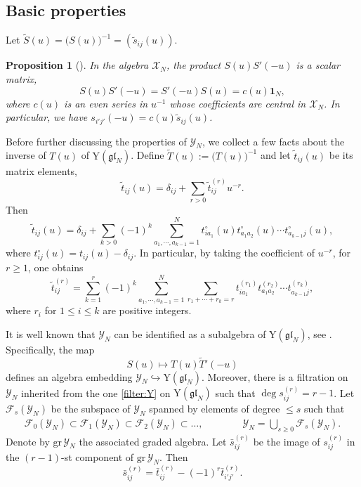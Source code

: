 \documentclass[11pt,reqno]{amsart}
\numberwithin{equation}{section}
\newtheorem{prop}[thm]{Proposition}
\theoremstyle{definition}
\theoremstyle{remark}
\newcommand{\beq}{\begin{equation}}
\newcommand{\eeq}{\end{equation}}
\newcommand{\gl}{\mathfrak{gl}}
\newcommand{\rY}{\mathrm{Y}}
\newcommand{\gr}{{\mathrm{gr}}}
\newcommand{\tl}{\tilde}
\newcommand{\wtl}{\widetilde}
\newcommand{\gge}{\geqslant}
\newcommand{\lle}{\leqslant}
\newcommand{\Y}{{\mathscr{Y}}}
\newcommand{\scrX}{{\mathscr{X}}}
\begin{document}
\subsection{Basic properties}\label{sec:basics}
Let $\wtl S(u)=\big(S(u)\big)^{-1}=(\tl s_{ij}(u))$.
\begin{prop}[{\cite[Prop. 2.1]{MR02}}]\label{Binv}
In the algebra $\scrX_N$, the product $S(u)S'(-u)$ is a scalar matrix,
\beq\label{cudef}
S(u)S'(-u)=S'(-u)S(u)=c(u)\mathbf{1}_N,
\eeq
where $c(u)$ is an even series in $u^{-1}$ whose coefficients are central in $\scrX_N$. In particular, we have $s_{i'j'}(-u)=c(u)\tl s_{ij}(u)$.
\end{prop}

Before further discussing the properties of $\Y_N$, we collect a few facts about the inverse of $T(u)$ of $\rY(\gl_N)$. Define $\wtl T(u):=\big(T(u)\big)^{-1}$ and let $\tl t_{ij}(u)$ be its matrix elements, 
$$
\tl t_{ij}(u)=\delta_{ij}+\sum_{r>0} \tl {t}_{ij}^{(r)}u^{-r}.
$$
Then
\beq\label{T'ij}
\tl t_{ij}(u)=\delta_{ij}+\sum_{k>0} (-1)^k\sum_{a_1,\cdots,a_{k-1}=1}^N t_{ia_1}^\circ(u)t_{a_1a_2}^\circ(u)\cdots t_{a_{k-1}j}^\circ(u),
\eeq
where $t_{ij}^\circ(u)=t_{ij}(u)-\delta_{ij}$. In particular, by taking the coefficient of $u^{-r}$, for $r\gge 1$, one obtains 
\beq\label{t'ijr}
\tl t_{ij}^{(r)}=\sum_{k=1}^r (-1)^k\sum_{a_1,\cdots,a_{k-1}=1}^N\sum_{r_1+\cdots+r_k=r}t_{ia_1}^{(r_1)}t_{a_1a_2}^{(r_2)}\cdots t_{a_{k-1}j}^{(r_k)},
\eeq
where $r_i$ for $1\lle i\lle k$ are positive integers.

It is well known that $\Y_N$ can be identified as a subalgebra of $\rY(\gl_N)$, see \cite[Thm. 3.1]{MR02}. Specifically, the map
\[
S(u)\mapsto T(u)\wtl T'(-u)
\]
defines an algebra embedding $\Y_N\hookrightarrow \rY(\gl_N)$.
Moreover, there is a filtration on $\Y_N$ inherited from the one \eqref{filter:Y} on $\rY(\gl_N)$ such that $\deg s_{ij}^{(r)}=r-1$. Let $\mathcal F_s(\Y_N)$ be the subspace of $\Y_N$ spanned by elements of degree $\lle s$ such that
\begin{align}
\label{filter:B}
    \mathcal F_0(\Y_N) \subset \mathcal F_1(\Y_N) \subset \mathcal F_2(\Y_N) \subset \ldots, 
    \qquad\qquad \Y_N =\bigcup_{s\gge 0}  \mathcal F_s(\Y_N).
\end{align}
Denote by $\gr\, \Y_N$ the associated graded algebra. Let $\bar s_{ij}^{(r)}$ be the image of $s_{ij}^{(r)}$ in the $(r-1)$-st component of $\gr\,\Y_N$. Then
\beq\label{image-quo}
\bar s_{ij}^{(r)}=\bar t_{ij}^{(r)}-(-1)^r\bar t_{i'j'}^{(r)}.
\eeq
\end{document}
